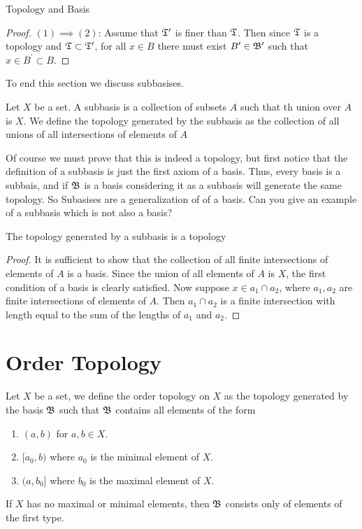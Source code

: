 \begin{chapter}{Topology and Basis}
\begin{proof}
        $(1) \implies (2)$: Assume that $\mathfrak{T}^\prime$ is finer than $\mathfrak{T}$. Then since $\mathfrak{T}$ is a topology and $\mathfrak{T} \subset \mathfrak{T}^\prime$, for all $x \in B$ 
        there must exist $B^\prime \in \mathfrak{B}^\prime$ such that $x \in B^\prime \subset B$. 
    \end{proof}
    
    To end this section we discuss subbasises. 

    
    \begin{defn}
        Let $X$ be a set. A subbasis is a collection of subsets $A$ such that th union over $A$ is $X$. We define the topology generated 
        by the subbasis as the collection of all unions of all intersections of elements of $A$
    \end{defn}

    Of course we must prove that this is indeed a topology, but first notice that the definition of a subbasis is just the first axiom of a basis. Thus, 
    every basis is a subbais, and if $\mathfrak{B}$ is a basis considering it as a subbasis will generate the same topology. So Subasises are a generalization of 
    of a basis. Can you give an example of a subbasis which is not also a basis? 

    
    \begin{prop}
        The topology generated by a subbasis is a topology
    \end{prop}
    
    \begin{proof}
        It is sufficient to show that the collection of all finite intersections of elements of $A$ is a basis. Since the union of all elements 
        of $A$ is $X$, the first condition of a basis is clearly satisfied. Now suppose $x \in a_1 \cap a_2$, where $a_1, a_2$ are finite intersections of elements of $A$.
        Then $a_1 \cap a_2$ is a finite intersection with length equal to the sum of the lengths of $a_1$ and $a_2$. 
    \end{proof}

    
    \section{Order Topology}
    
    \begin{defn}
        Let $X$ be a set, we define the order topology on $X$ as the topology generated by the basis $\mathfrak{B}$ such that 
        $\mathfrak{B}$ contains all elements of the form 
        
        \begin{enumerate}
            \item $(a, b)$ for $a, b \in X$. 
            \item $[a_0, b)$ where $a_0 $ is the minimal element of $X$. 
            \item $(a, b_0]$ where $b_0$ is the maximal element of $X$.
        \end{enumerate}
        If $X$ has no maximal or minimal elements, then $\mathfrak{B}$ consists only of elements of the first type. 
    \end{defn}


\end{chapter}

